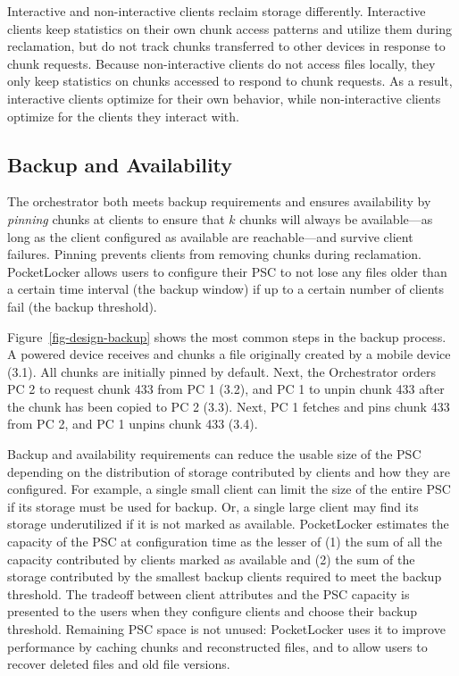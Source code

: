 Interactive and non-interactive clients reclaim storage differently.
Interactive clients keep statistics on their own chunk access patterns and
utilize them during reclamation, but do not track chunks transferred to other
devices in response to chunk requests. Because non-interactive clients do not
access files locally, they only keep statistics on chunks accessed to respond
to chunk requests. As a result, interactive clients optimize for their own
behavior, while non-interactive clients optimize for the clients they
interact with.

\subsection{Backup and Availability}
\label{subsec-backup}

The orchestrator both meets backup requirements and ensures availability by
\textit{pinning} chunks at clients to ensure that $k$ chunks will always be
available---as long as the client configured as available are reachable---and
survive client failures. Pinning prevents clients from removing chunks during
reclamation. PocketLocker allows users to configure their PSC to not lose any
files older than a certain time interval (the backup window) if up to a
certain number of clients fail (the backup threshold).

Figure~\ref{fig-design-backup} shows the most common steps in the backup
process.  A powered device receives and chunks a file originally created by a
mobile device (3.1).  All chunks are initially pinned by default.  Next, the
Orchestrator orders PC 2 to request chunk 433 from PC 1 (3.2), and PC 1 to
unpin chunk 433 after the chunk has been copied to PC 2 (3.3).  Next, PC 1
fetches and pins chunk 433 from PC 2, and PC 1 unpins chunk 433 (3.4). 

Backup and availability requirements can reduce the usable size of the PSC
depending on the distribution of storage contributed by clients and how they
are configured. For example, a single small client can limit the size of the
entire PSC if its storage must be used for backup. Or, a single large client
may find its storage underutilized if it is not marked as available.
PocketLocker estimates the capacity of the PSC at configuration time as the
lesser of (1) the sum of all the capacity contributed by clients marked as
available and (2) the sum of the storage contributed by the smallest backup
clients required to meet the backup threshold. The tradeoff between client
attributes and the PSC capacity is presented to the users when they configure
clients and choose their backup threshold. Remaining PSC space is not unused:
PocketLocker uses it to improve performance by caching chunks and
reconstructed files, and to allow users to recover deleted files and old file
versions.

